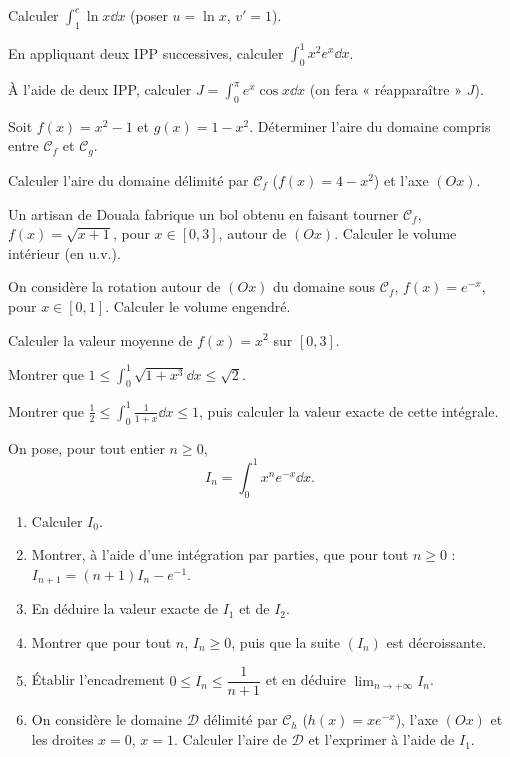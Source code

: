 \exo{} Calculer $\displaystyle\int_1^e \ln x\dd x$ (poser $u=\ln x$, $v'=1$).

\exo{} En appliquant deux IPP successives, calculer $\displaystyle\int_0^1 x^2 e^{x}\dd x$.

\exo{} À l'aide de deux IPP, calculer $\displaystyle J=\int_0^{\pi} e^{x}\cos x\dd x$
(on fera « réapparaître » $J$).

\exo{} Soit $f(x)=x^2-1$ et $g(x)=1-x^2$. Déterminer l'aire du domaine compris entre $\mathcal C_f$
et $\mathcal C_g$.

\exo{} Calculer l'aire du domaine délimité par $\mathcal C_f$ ($f(x)=4-x^2$) et l'axe $(Ox)$.

\exo{} Un artisan de Douala fabrique un bol obtenu en faisant tourner $\mathcal C_f$, $f(x)=\sqrt{x+1}$,
pour $x\in[0,3]$, autour de $(Ox)$. Calculer le volume intérieur (en u.v.).

\exo{} On considère la rotation autour de $(Ox)$ du domaine sous $\mathcal C_f$,
$f(x)=e^{-x}$, pour $x\in[0,1]$. Calculer le volume engendré.

\exo{} Calculer la valeur moyenne de $f(x)=x^2$ sur $[0,3]$.

\exo{} Montrer que $\displaystyle 1\le\int_0^1\sqrt{1+x^3}\dd x\le\sqrt2$.

\exo{} Montrer que $\displaystyle\frac{1}{2}\le\int_0^1\frac{1}{1+x}\dd x\le 1$, puis calculer la valeur exacte de cette intégrale.

\exo{} On pose, pour tout entier $n\ge0$,
\[
I_n=\int_0^1 x^n e^{-x}\dd x.
\]
\begin{enumerate}[label=\arabic*)]
\item Calculer $I_0$.
\item Montrer, à l'aide d'une intégration par parties, que pour tout $n\ge0$ :
$I_{n+1}=(n+1)I_n-e^{-1}$.
\item En déduire la valeur exacte de $I_1$ et de $I_2$.
\item Montrer que pour tout $n$, $I_n\ge0$, puis que la suite $(I_n)$ est décroissante.
\item Établir l'encadrement $0\le I_n\le\dfrac{1}{n+1}$ et en déduire $\displaystyle\lim_{n\to+\infty}I_n$.
\item On considère le domaine $\mathcal D$ délimité par $\mathcal C_h$ ($h(x)=x e^{-x}$), l'axe $(Ox)$
et les droites $x=0$, $x=1$. Calculer l'aire de $\mathcal D$ et l'exprimer à l'aide de $I_1$.
\end{enumerate}

